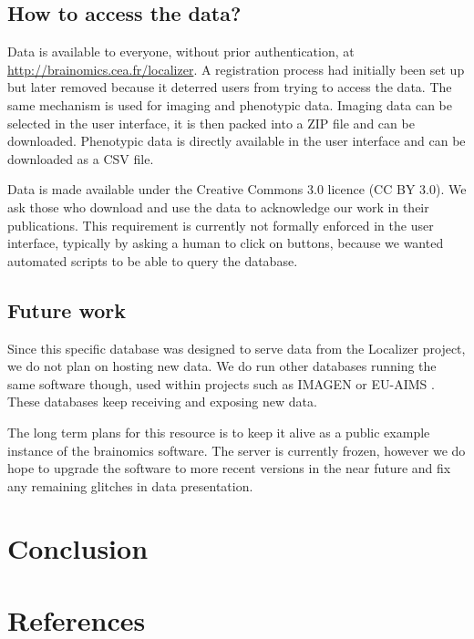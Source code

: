 \documentclass[review]{elsarticle}
\begin{document}
\subsection{How to access the data?}

Data is available to everyone, without prior authentication, at
\url{http://brainomics.cea.fr/localizer}. A registration process
had initially been set up but later removed because it deterred
users from trying to access the data. The same mechanism is used
for imaging and phenotypic data. Imaging data can be selected in the
user interface, it is then packed into a ZIP file and can be downloaded.
Phenotypic data is directly available in the user interface and can be
downloaded as a CSV file.

Data is made available under the Creative Commons 3.0 licence (CC BY 3.0). We ask those who download and use the data to acknowledge our work in their publications. This requirement is currently not formally enforced in the user interface, typically by asking a human to click on buttons, because we wanted automated scripts to be able to query the database.


\subsection{Future work}

Since this specific database was designed to serve data from the Localizer
project, we do not plan on hosting new data. We do run other databases
running the same software though, used within projects such as
IMAGEN \cite{Imagen2010} or EU-AIMS \cite{Aims2014}. These databases
keep receiving and exposing new data.

The long term plans for this resource is to keep it alive as a public
example instance of the {brainomics} software. The server is currently
frozen, however we do hope to upgrade the software to more recent versions
in the near future and fix any remaining glitches in data presentation.


\section{Conclusion}


\section*{References}


\end{document}

